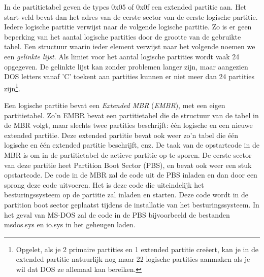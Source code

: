 In de partitietabel geven de types 0x05 of 0x0f een extended
partitie aan. Het start-veld bevat dan het adres van de eerste sector
van de eerste logische partitie. Iedere logische partitie verwijst
naar de volgende logische partitie. Zo is er geen beperking van het
aantal logische partities door de grootte van de gebruikte tabel. Een
structuur waarin ieder element verwijst naar het volgende noemen we
een \emph{gelinkte lijst}. Als limiet voor het aantal
logische partities wordt vaak 24 opgegeven. De gelinkte lijst kan
zonder problemen langer zijn, maar aangezien DOS letters vanaf 'C'
toekent aan partities kunnen er niet meer dan 24 partities
zijn\footnote{Opgelet, als je 2 primaire partities en 1 extended partitie
cre\"eert, kan je in de extended partitie natuurlijk nog maar 22 logische
partities aanmaken als je wil dat DOS ze allemaal kan bereiken.}.

Een logische partitie bevat een \emph{Extended
MBR} (\emph{EMBR}), met een eigen
partitietabel. Zo'n EMBR bevat een partitietabel die de structuur van
de tabel in de MBR volgt, maar slechts twee partities beschrijft: \'e\'en
logische en een nieuwe extended partitie. Deze extended partitie bevat
ook weer zo'n tabel die \'e\'en logische en \'e\'en extended partitie
beschrijft, enz. De taak van de opstartcode in de MBR is om in de
partitietabel de actieve partitie op te sporen. De eerste sector van
deze partitie heet Partition Boot Sector (PBS), en bevat ook weer een
stuk opstartcode. De code in de MBR zal de code uit de PBS inladen en
dan door een sprong deze code uitvoeren. Het is deze code die
uiteindelijk het besturingssysteem op de partitie zal inladen en
starten. Deze code wordt in de partition boot sector geplaatst tijdens
de installatie van het besturingssysteem. In het geval van MS-DOS zal
de code in de PBS bijvoorbeeld de bestanden msdos.sys en io.sys in het
geheugen laden.
